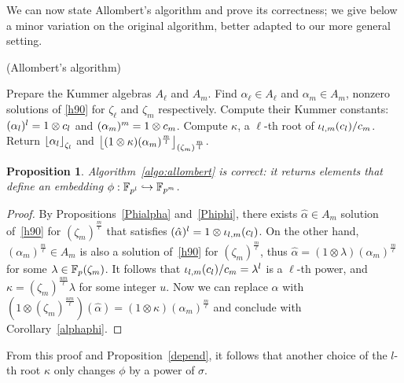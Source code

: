 \documentclass{sig-alternate}
\newtheorem{proposition}[theorem]{Proposition}
\begin{document}
We can now state Allombert's algorithm and prove its correctness; we
give below a minor variation on the original algorithm, better adapted
to our more general setting.
\begin{algorithm}
  \caption{(Allombert's algorithm)}
  \label{algo:allombert}
  \begin{algorithmic}[1]
  \STATE Prepare the Kummer algebras $A_\ell$ and $A_m$.
  \STATE Find $\alpha_\ell\in A_\ell$ and $\alpha_m\in A_m$, nonzero solutions of \eqref{h90} for $\zeta_\ell$
  and $\zeta_m$ respectively.
  \STATE Compute their Kummer constants: $(\alpha_l)^l=1\otimes c_l$ and
  $(\alpha_m)^m=1\otimes c_m$.
  \STATE Compute $\kappa$, a $\ell$-th root of ${\iota_{{l},{m}}}(c_l)/c_m$.
  \STATE Return $\left\lfloor \alpha_{l} \right\rfloor_{\zeta_l}$ and $\left\lfloor (1\otimes\kappa)(\alpha_m)^{\frac{m}{l}} \right\rfloor_{(\zeta_m)^{\frac{m}{l}}}$.
  \end{algorithmic}
\end{algorithm}
\begin{proposition}
  Algorithm~\ref{algo:allombert} is correct: it returns elements that define an
  embedding $\phi:\mathbb{F}_{p^l}\hookrightarrow\mathbb{F}_{p^m}$.
\end{proposition}
\begin{proof}
By Propositions~\ref{Phialpha} and~\ref{Phiphi}, there exists $\hat{\alpha}\in A_m$
solution of~\eqref{h90} for $(\zeta_m)^{\frac{m}{\ell}}$ that satisfies $(\hat{\alpha})^l=1\otimes{\iota_{{l},{m}}}(c_l)$.
On the other hand, $(\alpha_m)^{\frac{m}{\ell}}\in A_m$ is also a solution of~\eqref{h90} for $(\zeta_m)^{\frac{m}{\ell}}$,
thus $\hat{\alpha}=(1\otimes\lambda)(\alpha_m)^{\frac{m}{\ell}}$ for some $\lambda\in\mathbb{F}_{p}(\zeta_m)$.
It follows that ${\iota_{{l},{m}}}(c_l)/c_m=\lambda^l$ is a $\ell$-th power,
and $\kappa = (\zeta_{m})^{\frac{um}{\ell}}\lambda$ for some integer $u$.
Now we can replace $\hat{\alpha}$
with $(1\otimes(\zeta_{m})^{\frac{um}{\ell}})(\hat{\alpha})=(1\otimes\kappa)(\alpha_m)^{\frac{m}{\ell}}$
and conclude with Corollary~\ref{alphaphi}.
\end{proof}
From this proof and Proposition~\ref{depend}, it follows that another choice of the $l$-th root $\kappa$
only changes $\phi$ by a power of $\sigma$.
    
\end{document}
